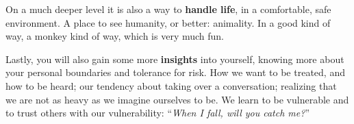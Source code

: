 On a much deeper level it is also a way to \textbf{handle life}, in a comfortable, safe environment.
A place to see humanity, or better: animality.
In a good kind of way, a monkey kind of way, which is very much fun.

Lastly, you will also gain some more \textbf{insights} into yourself, knowing more about your personal boundaries and tolerance for risk.
How we want to be treated, and how to be heard;
our tendency about taking over a conversation; realizing that we are not as heavy as we imagine ourselves to be.
We learn to be vulnerable and to trust others with our vulnerability: ``\textit{When I fall, will you catch me?}''